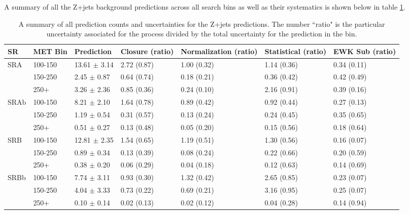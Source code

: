       A summary of all the Z+jets background predictions across all search bins as well as their systematics is shown below in table \ref{tab:template_systematics_summary}.

      \begin{table}[!h]
        \scriptsize
        \centering
        \caption{\label{tab:template_systematics_summary} A summary of all prediction counts and uncertainties for the Z+jets predictions. The number ``ratio" is the particular uncertainty associated for the process divided by the total uncertainty for the prediction in the \MET bin.
          }
        \begin{center}
          \begin{tabular} {l |l | l | l | l | l | l}
            SR & MET Bin & Prediction & Closure (ratio) & Normalization (ratio) & Statistical (ratio) & EWK Sub (ratio) \\ \hline
            SRA & 100-150 & 13.61 $\pm$ 3.14 & 2.72 (0.87) & 1.00 (0.32) & 1.14 (0.36) & 0.34 (0.11) \\
            & 150-250 & 2.45 $\pm$ 0.87 & 0.64 (0.74) & 0.18 (0.21) & 0.36 (0.42) & 0.42 (0.49) \\
            & 250+ & 3.26 $\pm$ 2.36 & 0.85 (0.36) & 0.24 (0.10) & 2.16 (0.91) & 0.39 (0.16) \\ \hline


            SRAb & 100-150 & 8.21 $\pm$ 2.10 & 1.64 (0.78) & 0.89 (0.42) & 0.92 (0.44) & 0.27 (0.13) \\
            & 150-250 & 1.19 $\pm$ 0.54 & 0.31 (0.57) & 0.13 (0.24) & 0.24 (0.45) & 0.35 (0.65) \\
            & 250+ & 0.51 $\pm$ 0.27 & 0.13 (0.48) & 0.05 (0.20) & 0.15 (0.56) & 0.18 (0.64) \\ \hline


            SRB & 100-150 & 12.81 $\pm$ 2.35 & 1.54 (0.65) & 1.19 (0.51) & 1.30 (0.56) & 0.16 (0.07) \\
            & 150-250 & 0.89 $\pm$ 0.34 & 0.13 (0.39) & 0.08 (0.24) & 0.22 (0.66) & 0.20 (0.59) \\
            & 250+ & 0.38 $\pm$ 0.20 & 0.06 (0.29) & 0.04 (0.18) & 0.12 (0.63) & 0.14 (0.69) \\ \hline


            SRBb & 100-150 & 7.74 $\pm$ 3.11 & 0.93 (0.30) & 1.32 (0.42) & 2.65 (0.85) & 0.23 (0.07) \\
            & 150-250 & 4.04 $\pm$ 3.33 & 0.73 (0.22) & 0.69 (0.21) & 3.16 (0.95) & 0.25 (0.07) \\
            & 250+ & 0.10 $\pm$ 0.14 & 0.02 (0.13) & 0.02 (0.12) & 0.04 (0.28) & 0.14 (0.94) \\ \hline



\end{tabular}
\end{center}
\end{table}
